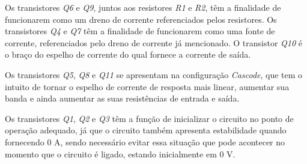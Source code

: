Os transistores \textit{Q6} e \textit{Q9}, juntos aos resistores \textit{R1} e \textit{R2}, t\^em a finalidade de funcionarem como um dreno de corrente referenciados pelos resistores. Os transistores \textit{Q4} e \textit{Q7} t\^em a finalidade de funcionarem como uma fonte de corrente, referenciados pelo dreno de corrente j\'a mencionado. O transistor \textit{Q10} \'e o braço do espelho de corrente do qual fornece a corrente de sa\'ida.

Os transistores \textit{Q5}, \textit{Q8} e \textit{Q11} se apresentam na configuração \textit{Cascode}, que tem o intuito de tornar o espelho de corrente de resposta mais linear, aumentar sua banda e ainda aumentar as suas resist\^encias de entrada e sa\'ida.

Os transistores \textit{Q1}, \textit{Q2} e \textit{Q3} t\^em a função de inicializar o circuito no ponto de operação adequado, j\'a que o circuito tamb\'em apresenta estabilidade quando fornecendo 0 A, sendo necess\'ario evitar essa situação que pode acontecer no momento que o circuito é ligado, estando inicialmente em 0 V.
